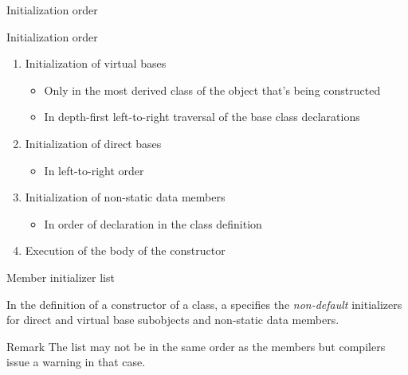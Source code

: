 \begin{frame}{Initialization order}{}
  \begin{block}{Initialization order}
    \begin{enumerate}
    \item
      Initialization of virtual bases
      \begin{itemize}
      \item
        Only in the most derived class of the object that's being constructed
      \item
        In depth-first left-to-right traversal of the base class declarations
      \end{itemize}
    \item
      Initialization of direct bases
      \begin{itemize}
      \item
        In left-to-right order
      \end{itemize}
    \item
      Initialization of non-static data members
      \begin{itemize}
      \item
        In order of declaration in the class definition
      \end{itemize}
    \item
      Execution of the body of the constructor
    \end{enumerate}
  \end{block}

\end{frame}


\begin{frame}{Member initializer list}{}
  \begin{definition}
    In the definition of a constructor of a class, a  specifies the \emph{non-default} initializers for direct and virtual base subobjects and non-static data members.
  \end{definition}

  \begin{block}{Remark}
    The list may not be in the same order as the members but compilers issue a warning in that case.
  \end{block}
\end{frame}

